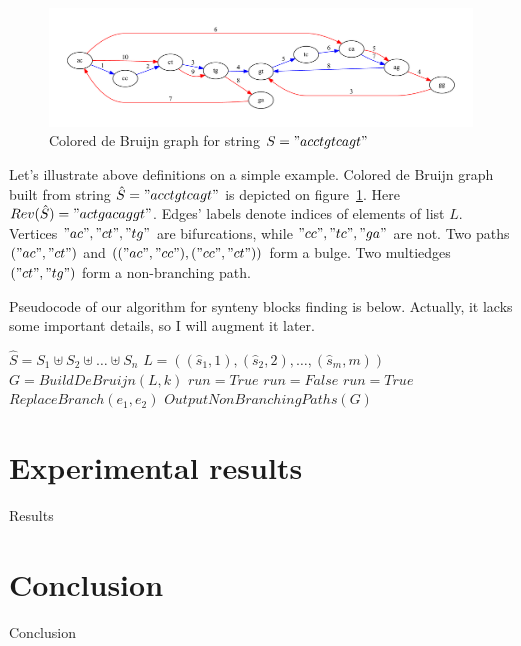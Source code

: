 \documentclass[a4paper,12pt]{scrartcl}
\begin{document}
\begin{figure}
	\includegraphics[scale = 0.50]{graph3.pdf}
	\small \caption{Colored de Bruijn graph for string \(S = "acctgtcagt" \) }
	\label{ColoredDeBruijn}
\end{figure}

Let's illustrate above definitions on a simple example. Colored de Bruijn graph built from string \(\hat{S} = "acctgtcagt"\)
is depicted on figure~\ref{ColoredDeBruijn}. Here \(Rev(\hat{S}) = "actgacaggt"\). Edges' labels denote indices of elements of
list \(L\). Vertices \("ac", "ct", "tg"\) are bifurcations, while \("cc", "tc", "ga"\) are not. Two paths \(("ac", "ct")\) and \((("ac", "cc"), ("cc", "ct"))\)
form a bulge. Two multiedges \(("ct", "tg")\) form a non-branching path.

Pseudocode of our algorithm for synteny blocks finding is below. Actually, it lacks some important details, so I will augment it later.

\begin{algorithm}[H]               
\small \caption*{\(SyntenyFinder(S = \lbrace S_{1}, S_{2}, \ldots, S_{n} \rbrace,  k, \delta)\)} 
\label{Pseudocode}
\begin{algorithmic}[1]     
\State \(\hat{S} = S_{1} \uplus S_{2} \uplus \ldots \uplus S_{n} \)
\State \(L = ((\hat{s}_1, 1), (\hat{s}_2, 2), \ldots, (\hat{s}_{m}, m))\)
\State \(G = BuildDeBruijn(L, k)\)
\State \(run = True\)
	\State \(run = False\)
				\State \(run = True\)
				\State \(ReplaceBranch(e_1, e_2)\)
			\EndIf
		\EndFor
	\EndFor
\EndWhile
\State \(OutputNonBranchingPaths(G)\)
\end{algorithmic}
\end{algorithm}

\section{Experimental results}
Results
\section{Conclusion}
Conclusion
\end{document}

